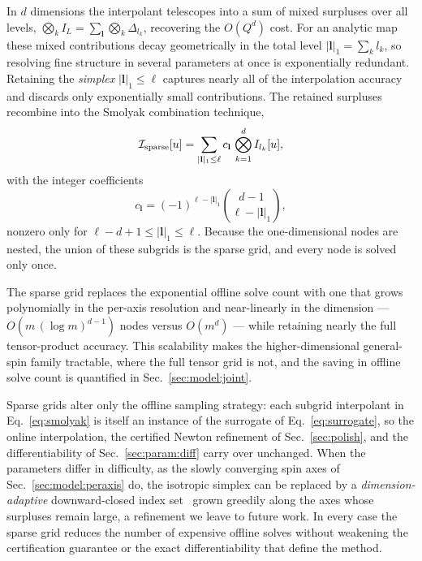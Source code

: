 \documentclass[
  aps,
  prd,
  twocolumn,
  amsmath,
  amssymb,
  nofootinbib,
  superscriptaddress,
  floatfix,
]{revtex4-2}
\begin{document}
In $d$ dimensions the interpolant telescopes into a sum of mixed surpluses over all
levels, $\bigotimes_k I_{L}=\sum_{\mathbf{l}}\bigotimes_k\Delta_{l_k}$, recovering
the $O(Q^d)$ cost. For an analytic map these mixed contributions decay geometrically
in the total level $|\mathbf{l}|_1=\sum_k l_k$, so resolving fine structure in
several parameters at once is exponentially redundant. Retaining the \emph{simplex}
$|\mathbf{l}|_1\le\ell$ captures nearly all of the interpolation accuracy and
discards only exponentially small contributions. The retained surpluses recombine
into the Smolyak combination technique,
\begin{equation}
  \mathcal{I}_{\rm sparse}[u] = \sum_{|\mathbf{l}|_1 \le \ell} c_{\mathbf{l}}\,
  \bigotimes_{k=1}^{d} I_{l_k}[u],
  \label{eq:smolyak}
\end{equation}
with the integer coefficients
\begin{equation}
  c_{\mathbf{l}} = (-1)^{\ell-|\mathbf{l}|_1}\binom{d-1}{\ell-|\mathbf{l}|_1},
  \label{eq:smolyak-coef}
\end{equation}
nonzero only for $\ell-d+1\le|\mathbf{l}|_1\le\ell$. Because the one-dimensional
nodes are nested, the union of these subgrids is the sparse grid, and every node is
solved only once.

The sparse grid replaces the exponential offline solve count with one that grows
polynomially in the per-axis resolution and near-linearly in the dimension ---
$O(m\,(\log m)^{d-1})$ nodes versus $O(m^d)$ --- while retaining nearly the full
tensor-product accuracy. This scalability makes the higher-dimensional general-spin
family tractable, where the full tensor grid is not, and the saving in offline solve
count is quantified in Sec.~\ref{sec:model:joint}.

Sparse grids alter only the offline sampling strategy: each subgrid interpolant in
Eq.~\eqref{eq:smolyak} is itself an instance of the surrogate of
Eq.~\eqref{eq:surrogate}, so the online interpolation, the certified Newton
refinement of Sec.~\ref{sec:polish}, and the differentiability of
Sec.~\ref{sec:param:diff} carry over unchanged. When the parameters differ in
difficulty, as the slowly converging spin axes of Sec.~\ref{sec:model:peraxis} do,
the isotropic simplex can be replaced by a \emph{dimension-adaptive} downward-closed
index set~\cite{NobileTemponeWebster2008} grown greedily along the axes whose
surpluses remain large, a refinement we leave to future work. In every case the
sparse grid reduces the number of expensive offline solves without weakening the
certification guarantee or the exact differentiability that define the method.
\end{document}
